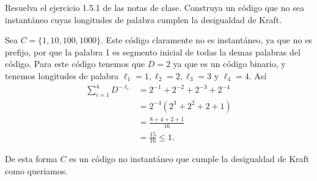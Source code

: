 
Resuelva el ejercicio 1.5.1 de las notas de clase.
Construya un código que no sea instantáneo cuyas longitudes  de palabra cumplen la desigualdad de Kraft.
\begin{sols}
Sea $C=\{1,10,100,1000\}$. Este código claramente no es instantáneo, ya que no es prefijo, por que la palabra 1 es segmento inicial de todas la demas palabras del código. Para este código tenemos que $D=2$ ya que es un código binario, y tenemos longitudes de palabra $\ell_1=1,\ell_2=2,\ell_3=3$ y $\ell_4=4.$ Así
\begin{align*}
       \sum_{i=1}^4 D^{-\ell_i}&=2^{-1}+2^{-2}+2^{-3}+2^{-4}\\
       &=2^{-4}(2^3+2^2+2+1)\\
       &=\frac{8+4+2+1}{16}\\
       &=\frac{15}{16}\leq 1.
   \end{align*} 

   De esta forma $C$ es un código no instantáneo que cumple la desigualdad de Kraft como queriamos.  
\end{sols}